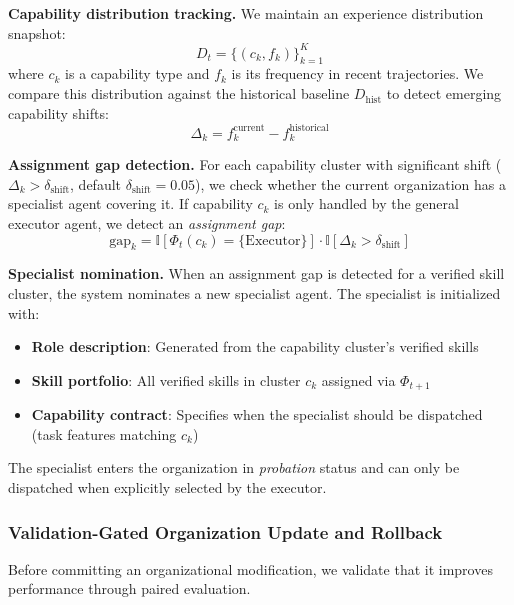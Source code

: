 \textbf{Capability distribution tracking.} We maintain an experience distribution snapshot:
\begin{equation}
    D_t = \{(c_k, f_k)\}_{k=1}^{K}
\end{equation}
where $c_k$ is a capability type and $f_k$ is its frequency in recent trajectories. We compare this distribution against the historical baseline $D_{\text{hist}}$ to detect emerging capability shifts:
\begin{equation}
    \Delta_k = f_k^{\text{current}} - f_k^{\text{historical}}
\end{equation}

\textbf{Assignment gap detection.} For each capability cluster with significant shift ($\Delta_k > \delta_{\text{shift}}$, default $\delta_{\text{shift}} = 0.05$), we check whether the current organization has a specialist agent covering it. If capability $c_k$ is only handled by the general executor agent, we detect an \emph{assignment gap}:
\begin{equation}
    \text{gap}_k = \mathbb{I}[\Phi_t(c_k) = \{\text{Executor}\}] \cdot \mathbb{I}[\Delta_k > \delta_{\text{shift}}]
\end{equation}

\textbf{Specialist nomination.} When an assignment gap is detected for a verified skill cluster, the system nominates a new specialist agent. The specialist is initialized with:
\begin{itemize}
    \item \textbf{Role description}: Generated from the capability cluster's verified skills
    \item \textbf{Skill portfolio}: All verified skills in cluster $c_k$ assigned via $\Phi_{t+1}$
    \item \textbf{Capability contract}: Specifies when the specialist should be dispatched (task features matching $c_k$)
\end{itemize}

The specialist enters the organization in \emph{probation} status and can only be dispatched when explicitly selected by the executor.

\subsubsection{Validation-Gated Organization Update and Rollback}

Before committing an organizational modification, we validate that it improves performance through paired evaluation.

